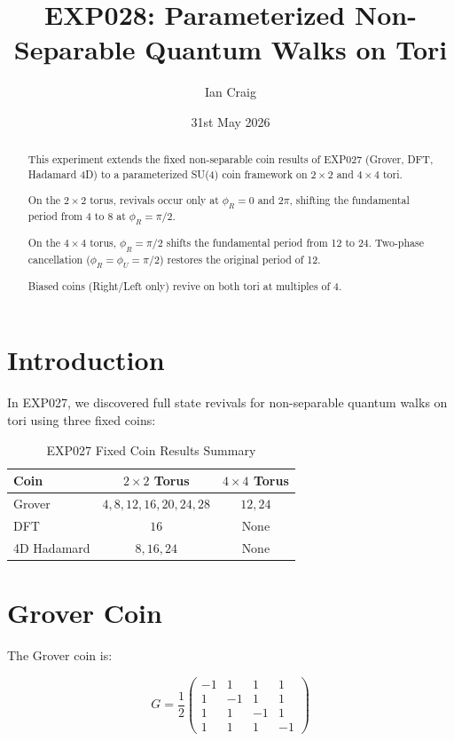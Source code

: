 \documentclass[12pt]{article}
\title{EXP028: Parameterized Non-Separable Quantum Walks on Tori}
\author{Ian Craig}
\date{31st May 2026}
\begin{document}
\maketitle

\begin{abstract}
This experiment extends the fixed non-separable coin results of EXP027 (Grover, DFT, Hadamard 4D) to a parameterized SU(4) coin framework on $2 \times 2$ and $4 \times 4$ tori. 

On the $2 \times 2$ torus, revivals occur only at $\phi_R = 0$ and $2\pi$, shifting the fundamental period from 4 to 8 at $\phi_R = \pi/2$.

On the $4 \times 4$ torus, $\phi_R = \pi/2$ shifts the fundamental period from 12 to 24. Two-phase cancellation ($\phi_R = \phi_U = \pi/2$) restores the original period of 12.

Biased coins (Right/Left only) revive on both tori at multiples of 4.
\end{abstract}

\section{Introduction}

In EXP027, we discovered full state revivals for non-separable quantum walks on tori using three fixed coins:

\begin{table}[H]
\centering
\caption{EXP027 Fixed Coin Results Summary}
\begin{tabular}{lcc}
\hline
\textbf{Coin} & \textbf{$2 \times 2$ Torus} & \textbf{$4 \times 4$ Torus} \\
\hline
Grover & $4, 8, 12, 16, 20, 24, 28$ & $12, 24$ \\
DFT & $16$ & None \\
4D Hadamard & $8, 16, 24$ & None \\
\hline
\end{tabular}
\end{table}

\section{Grover Coin}

The Grover coin is:

\[
G = \frac{1}{2}\begin{pmatrix}
-1 & 1 & 1 & 1 \\
1 & -1 & 1 & 1 \\
1 & 1 & -1 & 1 \\
1 & 1 & 1 & -1
\end{pmatrix}
\]
\end{document}
